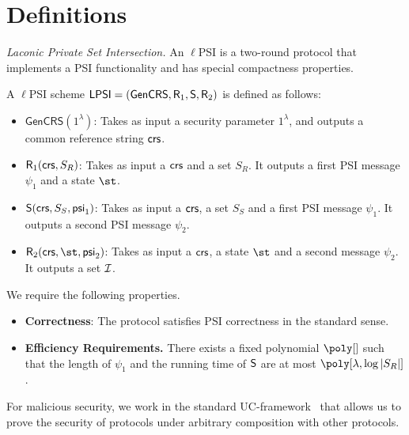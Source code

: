 \section{Definitions}
\noindent \emph{Laconic Private Set Intersection.} An $\ell$PSI is a two-round protocol that implements a PSI functionality  and has special compactness properties.

\begin{definition}
A $\ell$PSI scheme $\mathsf{LPSI}=(\mathsf{GenCRS},\mathsf{R}_1,\mathsf{S},\mathsf{R}_2)$ is defined as follows:
\begin{itemize}
    \item $\mathsf{GenCRS}(1^\lambda)$: Takes as input a security parameter $1^\lambda$, and outputs  a common reference string $\mathsf{crs}$.
    \item $\mathsf{R}_1(\mathsf{crs},S_R)$: Takes as input a $\mathsf{crs}$ and a set $S_R$. It outputs a first PSI message $\psi_1$ and a state $\st$.
\item $\mathsf{S}(\mathsf{crs},S_S,\mathsf{psi}_1)$: Takes as input a $\mathsf{crs}$, a set $S_S$ and a first PSI message $\psi_1$. It outputs a second PSI message $\psi_2$.
\item $\Rs_2(\crs,\st,\psi_2)$: Takes as input a $\mathsf{crs}$, a state $\st$ and a  second message $\psi_2$. It outputs a set $\mathcal{I}$.
\end{itemize}
We require the following properties.
\begin{itemize}
    \item \textbf{Correctness}: The protocol satisfies PSI correctness in the standard sense.
    \item \textbf{Efficiency Requirements.} There exists a fixed polynomial $\poly[]$ such that   the length of $\psi_1$  and  the running time of  $\mathsf{S}$ are at most  $\poly[\lambda,  \log |S_R|]$.
\end{itemize}
\end{definition}

For malicious security, we work in the standard UC-framework~\cite{FOCS:Canetti01} that allows us to prove the security of protocols under arbitrary composition with other protocols.

